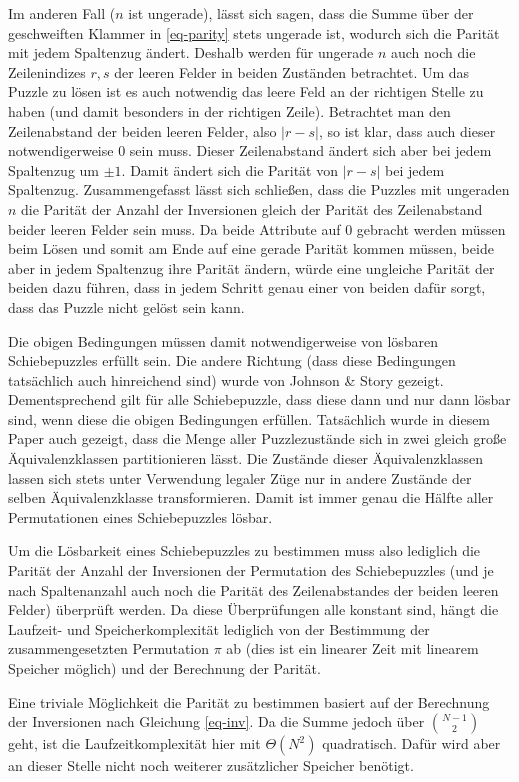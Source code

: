 \documentclass{whswinvcbook}
\begin{document}
Im anderen Fall ($n$ ist ungerade), lässt sich sagen, dass die Summe über der geschweiften Klammer in \ref{eq-parity} stets ungerade ist, wodurch sich die Parität mit jedem Spaltenzug ändert. Deshalb werden für ungerade $n$ auch noch die Zeilenindizes $r,s$ der leeren Felder in beiden Zuständen betrachtet. Um das Puzzle zu lösen ist es auch notwendig das leere Feld an der richtigen Stelle zu haben (und damit besonders in der richtigen Zeile). Betrachtet man den Zeilenabstand der beiden leeren Felder, also $|r-s|$, so ist klar, dass auch dieser notwendigerweise $0$ sein muss. Dieser Zeilenabstand ändert sich aber bei jedem Spaltenzug um $\pm1$. Damit ändert sich die Parität von $|r-s|$ bei jedem Spaltenzug. Zusammengefasst lässt sich schließen, dass die Puzzles mit ungeraden $n$ die Parität der Anzahl der Inversionen gleich der Parität des Zeilenabstand beider leeren Felder sein muss. Da beide Attribute auf $0$ gebracht werden müssen beim Lösen und somit am Ende auf eine gerade Parität kommen müssen, beide aber in jedem Spaltenzug ihre Parität ändern, würde eine ungleiche Parität der beiden dazu führen, dass in jedem Schritt genau einer von beiden dafür sorgt, dass das Puzzle nicht gelöst sein kann.

Die obigen Bedingungen müssen damit notwendigerweise von lösbaren Schiebepuzzles erfüllt sein. Die andere Richtung (dass diese Bedingungen tatsächlich auch hinreichend sind) wurde von Johnson \& Story \cite{fift} gezeigt. Dementsprechend gilt für alle Schiebepuzzle, dass diese dann und nur dann lösbar sind, wenn diese die obigen Bedingungen erfüllen. Tatsächlich wurde in diesem Paper auch gezeigt, dass die Menge aller Puzzlezustände sich in zwei gleich große Äquivalenzklassen partitionieren lässt. Die Zustände dieser Äquivalenzklassen lassen sich stets unter Verwendung legaler Züge nur in andere Zustände der selben Äquivalenzklasse transformieren. Damit ist immer genau die Hälfte aller Permutationen eines Schiebepuzzles lösbar.

Um die Lösbarkeit eines Schiebepuzzles zu bestimmen muss also lediglich die Parität der Anzahl der Inversionen der Permutation des Schiebepuzzles (und je nach Spaltenanzahl auch noch die Parität des Zeilenabstandes der beiden leeren Felder) überprüft werden. Da diese Überprüfungen alle konstant sind, hängt die Laufzeit- und Speicherkomplexität lediglich von der Bestimmung der zusammengesetzten Permutation $\pi$ ab (dies ist ein linearer Zeit mit linearem Speicher möglich) und der Berechnung der Parität.

Eine triviale Möglichkeit die Parität zu bestimmen basiert auf der Berechnung der Inversionen nach Gleichung \ref{eq-inv}. Da die Summe jedoch über $\binom{N-1}{2}$ geht, ist die Laufzeitkomplexität hier mit $\Theta(N^2)$ quadratisch. Dafür wird aber an dieser Stelle nicht noch weiterer zusätzlicher Speicher benötigt.
\end{document}
